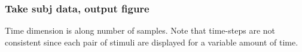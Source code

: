 \documentclass[
]{book}
\newenvironment{Shaded}{\begin{snugshade}}{\end{snugshade}}
\newcommand{\DecValTok}[1]{\textcolor[rgb]{0.00,0.00,0.81}{#1}}
\newcommand{\NormalTok}[1]{#1}
\newcommand{\OtherTok}[1]{\textcolor[rgb]{0.56,0.35,0.01}{#1}}
\newcommand{\SpecialCharTok}[1]{\textcolor[rgb]{0.81,0.36,0.00}{\textbf{#1}}}
\begin{document}
\begin{Shaded}
\end{Shaded}

\hypertarget{take-subj-data-output-figure}{%
\subsubsection*{Take subj data, output figure}\label{take-subj-data-output-figure}}

Time dimension is along number of samples. Note that time-steps are not consistent since each pair of stimuli are displayed for a variable amount of time.
\end{document}
